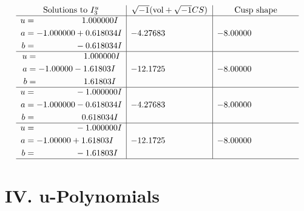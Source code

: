 \documentclass[1p]{elsarticle_modified}
\theoremstyle{definition}
\newcommand{\I}{\sqrt{-1}}
\begin{document}
$$\begin{array}{c|c|c}  
\text{Solutions to }I^u_{3}& \I (\text{vol} + \sqrt{-1}CS) & \text{Cusp shape}\\
 \hline 
\begin{aligned}
u &= \phantom{-0.000000 -}1.000000 I \\
a &= -1.000000 + 0.618034 I \\
b &= \phantom{-0.000000 } -0.618034 I\end{aligned}
 & -4.27683\phantom{ +0.000000I} & -8.00000\phantom{ +0.000000I} \\ \hline\begin{aligned}
u &= \phantom{-0.000000 -}1.000000 I \\
a &= -1.00000 - 1.61803 I \\
b &= \phantom{-0.000000 -}1.61803 I\end{aligned}
 & -12.1725\phantom{ +0.000000I} & -8.00000\phantom{ +0.000000I} \\ \hline\begin{aligned}
u &= \phantom{-0.000000 } -1.000000 I \\
a &= -1.000000 - 0.618034 I \\
b &= \phantom{-0.000000 -}0.618034 I\end{aligned}
 & -4.27683\phantom{ +0.000000I} & -8.00000\phantom{ +0.000000I} \\ \hline\begin{aligned}
u &= \phantom{-0.000000 } -1.000000 I \\
a &= -1.00000 + 1.61803 I \\
b &= \phantom{-0.000000 } -1.61803 I\end{aligned}
 & -12.1725\phantom{ +0.000000I} & -8.00000\phantom{ +0.000000I}\\
 \hline 
 \end{array}$$\newpage
\newpage\renewcommand{\arraystretch}{1}
\centering \section*{ IV. u-Polynomials}
\end{document}
